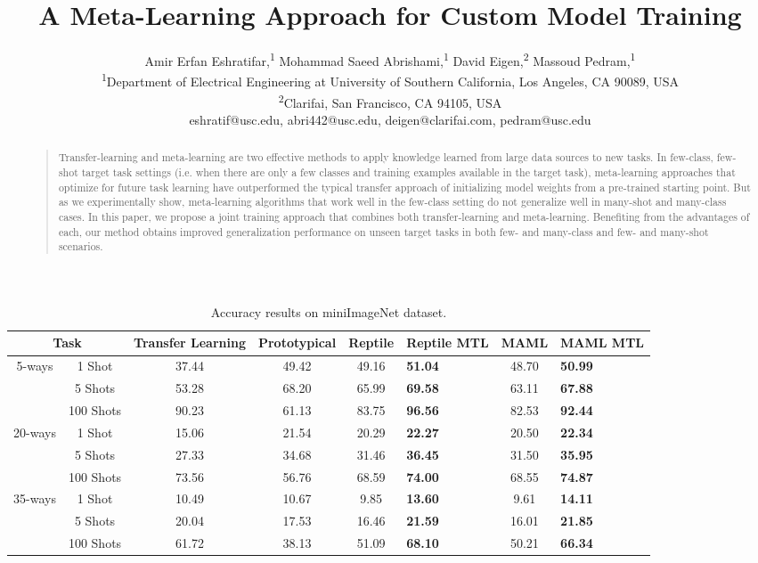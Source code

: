 \documentclass[letterpaper]{article}
\title{A Meta-Learning Approach for Custom Model Training}
\author{Amir Erfan Eshratifar,\textsuperscript{1}
         Mohammad Saeed Abrishami,\textsuperscript{1}
         David Eigen,\textsuperscript{2}
         Massoud Pedram,\textsuperscript{1}\\
\textsuperscript{1}{Department of Electrical Engineering at University of Southern California, Los Angeles, CA 90089, USA}\\
\textsuperscript{2}{Clarifai, San Francisco, CA 94105, USA}\\
eshratif@usc.edu,
abri442@usc.edu,
deigen@clarifai.com,
pedram@usc.edu}
\begin{document}
\maketitle
\begin{abstract}
\begin{quote}

Transfer-learning and meta-learning are two effective methods to apply knowledge learned from large data sources to new tasks. In few-class, few-shot target task settings (i.e. when there are only a few classes and training examples available in the target task), meta-learning approaches that optimize for future task learning have outperformed the typical transfer approach of initializing model weights from a pre-trained starting point. But as we experimentally show, meta-learning algorithms that work well in the few-class setting do not generalize well in many-shot and many-class cases. In this paper, we propose a joint training approach that combines both transfer-learning and meta-learning. Benefiting from the advantages of each, our method obtains improved generalization performance on unseen target tasks in both few- and many-class and few- and many-shot scenarios.


\end{quote}
\end{abstract}
\begin{table}[ht]
\caption{Accuracy results on miniImageNet dataset.}
  \centering
\label{tab:miniimagenet_results}
\begin{adjustbox}{width=0.2\columnwidth}
\begin{tabular}{c|c|c|c|c|b|c|b}
\multicolumn{2}{c|}{Task}   & Transfer Learning & Prototypical & Reptile & Reptile MTL & MAML & MAML MTL\\
\hline
\multirow{3}{*}{5-ways}  & 1 Shot   &   37.44    & 49.42   & 49.16    & \textbf{51.04}  &   48.70    &  \textbf{50.99}\\
                         & 5 Shots  &   53.28    & 68.20   & 65.99    & \textbf{69.58}  &   63.11   &   \textbf{67.88}\\
                         & 100 Shots &   90.23    & 61.13   & 83.75    & \textbf{96.56}  &   82.53    & \textbf{92.44}\\
\hline
\multirow{3}{*}{20-ways} & 1 Shot   &   15.06    & 21.54   & 20.29    & \textbf{22.27}  &   20.50    & \textbf{22.34}\\
                         & 5 Shots  &   27.33    & 34.68   & 31.46    & \textbf{36.45}  &   31.50    & \textbf{35.95}\\
                         & 100 Shots &   73.56    & 56.76   & 68.59    & \textbf{74.00}  &   68.55    & \textbf{74.87}\\
\hline
\multirow{3}{*}{35-ways} & 1 Shot   &   10.49    & 10.67   & 9.85    & \textbf{13.60}  &   9.61    & \textbf{14.11}\\
                         & 5 Shots  &   20.04    & 17.53   & 16.46    & \textbf{21.59}  &   16.01    & \textbf{21.85} \\
                         & 100 Shots &   61.72    & 38.13   & 51.09    & \textbf{68.10}  &   50.21    & \textbf{66.34}
\end{tabular}
\end{adjustbox}
\end{table}
\end{document}
